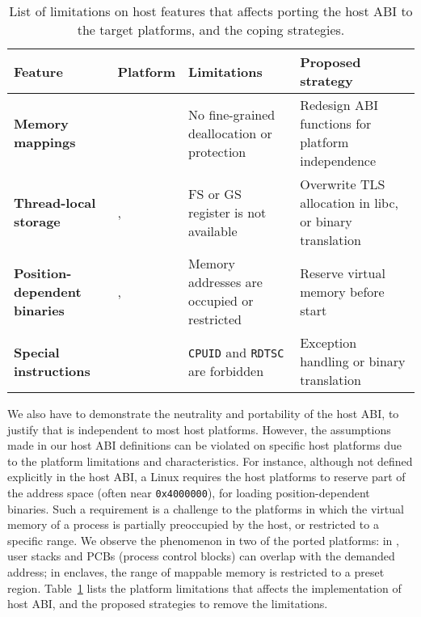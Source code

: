 \begin{table}[t]
\footnotesize
\centering
\begin{tabular}{>{\bf}p{1.2in}>{\raggedright\arraybackslash}p{0.8in}>{\raggedright\arraybackslash}p{1.6in}>{\raggedright\arraybackslash}p{2.2in}}
\toprule
{\bf Feature} & {\bf Platform} & {\bf Limitations} & {\bf Proposed strategy} \\
\midrule
Memory mappings & \win{} & No fine-grained deallocation or protection & Redesign ABI functions for platform independence \\
\midrule
Thread-local storage & \win{}, \osx{} & FS or GS register is not available & Overwrite TLS allocation in libc, or binary translation \\
\midrule
Position-dependent binaries & \win{}, \sgx{} & Memory addresses are occupied or restricted & Reserve virtual memory before \picoprocs{} start \\
\midrule
Special instructions & \sgx{} & {\tt CPUID} and {\tt RDTSC} are forbidden & Exception handling or binary translation \\
\bottomrule
\end{tabular}
\caption[List of platform limitations affecting host ABI porting]
{List of limitations on host features that affects porting the host ABI to the target platforms,
and the coping strategies.}
\label{tab:future:abi-limit}
\end{table}

We also have to demonstrate the neutrality and portability of the host ABI,
to justify that \graphene{} is independent to most host platforms.
However, the assumptions made in our host ABI definitions
can be violated on specific host platforms
due to the platform limitations and characteristics.
For instance, although not defined explicitly in the host ABI,
a Linux \picoprocs{} requires the host platforms
to reserve part of the address space (often near {\tt 0x4000000}), for loading position-dependent binaries.
Such a requirement is a challenge to the platforms
in which the virtual memory of a process is partially preoccupied by the host,
or restricted to a specific range.
We observe the phenomenon in two of the ported platforms:
in \win{}, user stacks and PCBs (process control blocks) can overlap with the demanded address;
in \sgx{} enclaves, the range of mappable memory is
restricted to a preset region.
Table~\ref{tab:future:abi-limit}
lists the platform limitations that affects the implementation of host ABI,
and the proposed strategies to remove the limitations.


